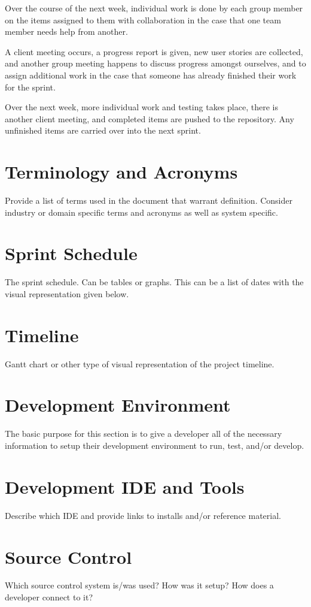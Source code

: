 Over the course of the next week, individual work is done by each group member on the items assigned to them with collaboration in the case that one team member needs help from another.

A client meeting occurs, a progress report is given, new user stories are collected, and another group meeting happens to discuss progress amongst ourselves, and to assign additional work in the case that someone has already finished their work for the sprint.

Over the next week, more individual work and testing takes place, there is another client meeting, and completed items are pushed to the repository. Any unfinished items are carried over into the next sprint.

\section{Terminology and Acronyms}
Provide a list of terms used in the document that warrant definition.  Consider 
industry or domain specific terms and acronyms as well as system specific. 

\section{Sprint Schedule}
The sprint schedule.  Can be tables or graphs.   This can be a list of dates with the visual 
representation given below.

\section{Timeline}
Gantt chart or other type of visual representation of the project timeline.

\section{Development Environment}
The basic purpose for this section is to give a developer all of the necessary 
information to setup their development environment to run, test, and/or develop. 


\section{Development IDE and Tools}
Describe which IDE and provide links to installs and/or reference material. 

\section{Source  Control}
Which source control system is/was used?  How was it setup?  How does a developer 
connect to it? 

